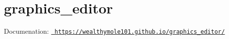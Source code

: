 \chapter{graphics\+\_\+editor}
\hypertarget{md__r_e_a_d_m_e}{}\label{md__r_e_a_d_m_e}
\label{md__r_e_a_d_m_e_autotoc_md0}%
%
Documenation\+: \href{https://wealthymole101.github.io/graphics_editor/}{\texttt{ https\+://wealthymole101.\+github.\+io/graphics\+\_\+editor/}} 